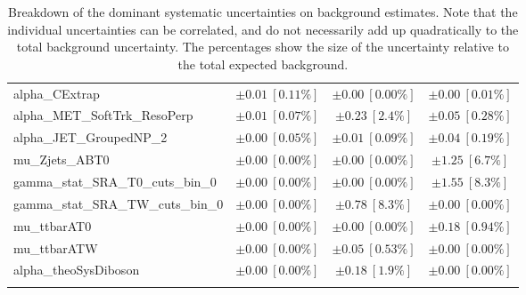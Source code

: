 \begin{table}
\begin{center}
\begin{tabular*}{\textwidth}{@{\extracolsep{\fill}}lccc}
alpha\_CExtrap         & $\pm 0.01\ [0.11\%] $          & $\pm 0.00\ [0.00\%] $          & $\pm 0.00\ [0.01\%] $       \\
alpha\_MET\_SoftTrk\_ResoPerp         & $\pm 0.01\ [0.07\%] $          & $\pm 0.23\ [2.4\%] $          & $\pm 0.05\ [0.28\%] $       \\
alpha\_JET\_GroupedNP\_2         & $\pm 0.00\ [0.05\%] $          & $\pm 0.01\ [0.09\%] $          & $\pm 0.04\ [0.19\%] $       \\
mu\_Zjets\_ABT0         & $\pm 0.00\ [0.00\%] $          & $\pm 0.00\ [0.00\%] $          & $\pm 1.25\ [6.7\%] $       \\
gamma\_stat\_SRA\_T0\_cuts\_bin\_0         & $\pm 0.00\ [0.00\%] $          & $\pm 0.00\ [0.00\%] $          & $\pm 1.55\ [8.3\%] $       \\
gamma\_stat\_SRA\_TW\_cuts\_bin\_0         & $\pm 0.00\ [0.00\%] $          & $\pm 0.78\ [8.3\%] $          & $\pm 0.00\ [0.00\%] $       \\
mu\_ttbarAT0         & $\pm 0.00\ [0.00\%] $          & $\pm 0.00\ [0.00\%] $          & $\pm 0.18\ [0.94\%] $       \\
mu\_ttbarATW         & $\pm 0.00\ [0.00\%] $          & $\pm 0.05\ [0.53\%] $          & $\pm 0.00\ [0.00\%] $       \\
alpha\_theoSysDiboson         & $\pm 0.00\ [0.00\%] $          & $\pm 0.18\ [1.9\%] $          & $\pm 0.00\ [0.00\%] $       \\
\noalign{\smallskip}\hline\noalign{\smallskip}
\end{tabular*}
\end{center}
\caption[Breakdown of uncertainty on background estimates]{
Breakdown of the dominant systematic uncertainties on background estimates.
Note that the individual uncertainties can be correlated, and do not necessarily add up quadratically to 
the total background uncertainty. The percentages show the size of the uncertainty relative to the total expected background.
\label{table.results.bkgestimate.uncertainties.SRA_TT_SRA_TW_SRA_T0}}
\end{table}
%
